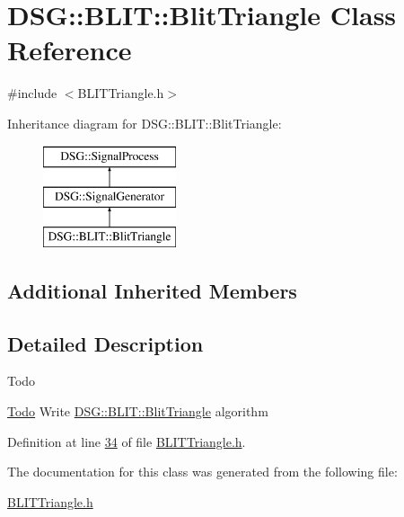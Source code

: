\hypertarget{class_d_s_g_1_1_b_l_i_t_1_1_blit_triangle}{\section{D\+S\+G\+:\+:B\+L\+I\+T\+:\+:Blit\+Triangle Class Reference}
\label{class_d_s_g_1_1_b_l_i_t_1_1_blit_triangle}
}


{\ttfamily \#include $<$B\+L\+I\+T\+Triangle.\+h$>$}

Inheritance diagram for D\+S\+G\+:\+:B\+L\+I\+T\+:\+:Blit\+Triangle\+:\begin{figure}[H]
\begin{center}
\leavevmode
\includegraphics[height=3.000000cm]{class_d_s_g_1_1_b_l_i_t_1_1_blit_triangle}
\end{center}
\end{figure}
\subsection*{Additional Inherited Members}


\subsection{Detailed Description}
\begin{DoxyRefDesc}{Todo}
\item[\hyperlink{todo__todo000004}{Todo}]Write \hyperlink{class_d_s_g_1_1_b_l_i_t_1_1_blit_triangle}{D\+S\+G\+::\+B\+L\+I\+T\+::\+Blit\+Triangle} algorithm \end{DoxyRefDesc}


Definition at line \hyperlink{_b_l_i_t_triangle_8h_source_l00034}{34} of file \hyperlink{_b_l_i_t_triangle_8h_source}{B\+L\+I\+T\+Triangle.\+h}.



The documentation for this class was generated from the following file\+:\begin{DoxyCompactItemize}
\item 
\hyperlink{_b_l_i_t_triangle_8h}{B\+L\+I\+T\+Triangle.\+h}\end{DoxyCompactItemize}

